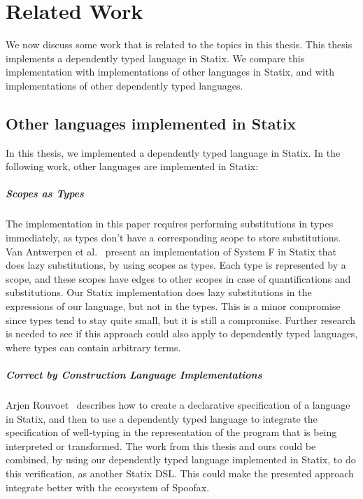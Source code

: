 \chapter{Related Work}
\label{ch:relatedwork}

We now discuss some work that is related to the topics in this thesis. This thesis implements a dependently typed language in Statix. We compare this implementation with implementations of other languages in Statix, and with implementations of other dependently typed languages.

\section{Other languages implemented in Statix}

In this thesis, we implemented a dependently typed language in Statix. In the following work, other languages are implemented in Statix:

\paragraph{Scopes as Types}

The implementation in this paper requires performing substitutions in types immediately, as types don't have a corresponding scope to store substitutions. Van Antwerpen et al.~\cite[sect 2.5]{scopes_as_types, nameres} present an implementation of System F in Statix that does lazy substitutions, by using scopes as types. Each type is represented by a scope, and these scopes have edges to other scopes in case of quantifications and substitutions. Our Statix implementation does lazy substitutions in the expressions of our language, but not in the types. This is a minor compromise since types tend to stay quite small, but it is still a compromise. Further research is needed to see if this approach could also apply to dependently typed languages, where types can contain arbitrary terms. 

\paragraph{Correct by Construction Language Implementations}

Arjen Rouvoet~\cite{Rouvoet21} describes how to create a declarative specification of a language in Statix, and then to use a dependently typed language to integrate the specification of well-typing in the representation of the program that is being interpreted or transformed. The work from this thesis and ours could be combined, by using our dependently typed language implemented in Statix, to do this verification, as another Statix DSL. This could make the presented approach integrate better with the ecosystem of Spoofax.

